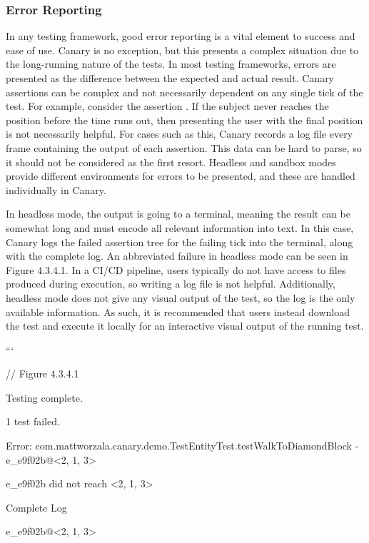 \documentclass{article}
\begin{document}
\begin{onehalfspacing}
\subsubsection{Error Reporting}

In any testing framework, good error reporting is a vital element to
success and ease of use. Canary is no exception, but this presents a
complex situation due to the long-running nature of the tests. In most
testing frameworks, errors are presented as the difference between the
expected and actual result. Canary assertions can be complex and not
necessarily dependent on any single tick of the test. For example,
consider the assertion . If the subject
never reaches the position  before the time
runs out, then presenting the user with the final position is not
necessarily helpful. For cases such as this, Canary records a log file
every frame containing the output of each assertion. This data can be
hard to parse, so it should not be considered as the first resort.
Headless and sandbox modes provide different environments for errors to
be presented, and these are handled individually in Canary.

In headless mode, the output is going to a terminal, meaning the result
can be somewhat long and must encode all relevant information into text.
In this case, Canary logs the failed assertion tree for the failing tick
into the terminal, along with the complete log. An abbreviated failure
in headless mode can be seen in Figure 4.3.4.1. In a CI/CD pipeline,
users typically do not have access to files produced during execution,
so writing a log file is not helpful. Additionally, headless mode does
not give any visual output of the test, so the log is the only available
information. As such, it is recommended that users instead download the
test and execute it locally for an interactive visual output of the
running test.

```

// Figure 4.3.4.1

Testing complete.

1 test failed.

Error: com.mattworzala.canary.demo.TestEntityTest.testWalkToDiamondBlock
- e\_e9f02b@\textless2, 1, 3\textgreater{}

e\_e9f02b did not reach \textless2, 1, 3\textgreater{}

Complete Log

e\_e9f02b@\textless2, 1, 3\textgreater{}


\end{onehalfspacing}
\end{document}
